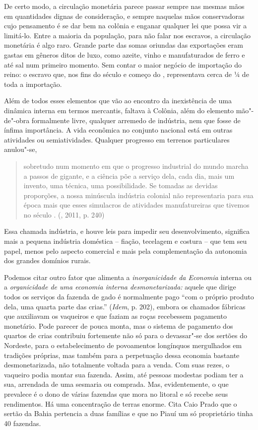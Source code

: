 De certo modo, a circulação monetária parece passar sempre nas mesmas
mãos em quantidades dignas de consideração, e sempre naquelas mãos
conservadoras cujo pensamento é se dar bem na colônia e enganar qualquer
lei que possa vir a limitá-lo. Entre a maioria da população, para não
falar nos escravos, a circulação monetária é algo raro. Grande parte das
somas oriundas das exportações eram gastas em gêneros ditos de luxo,
como azeite, vinho e manufaturados de ferro e até sal num primeiro
momento. Sem contar o maior negócio de importação do reino: o escravo
que, nos fins do século  e começo do , representava cerca de ¼
de toda a importação.

Além de todos esses elementos que vão ao encontro da inexistência de uma
dinâmica interna em termos mercantis, faltava à Colônia, além do
elemento mão"-de"-obra formalmente livre, qualquer arremedo de indústria,
nem que fosse de ínfima importância. A vida econômica no conjunto
nacional está em outras atividades ou semiatividades. Qualquer progresso
em terrenos particulares anulou"-se,

\begin{quote}
sobretudo num momento em que o progresso industrial do mundo marcha a
passos de gigante, e a ciência põe a serviço dela, cada dia, mais um
invento, uma técnica, uma possibilidade. Se tomadas as devidas
proporções, a nossa minúscula indústria colonial não representaria para
sua época mais que esses simulacros de atividades manufatureiras que
tivemos no século . (, 2011, p. 240)
\end{quote}

Essa chamada indústria, e houve leis para impedir seu desenvolvimento,
significa mais a pequena indústria doméstica -- fiação, tecelagem e
costura -- que tem seu papel, menos pelo aspecto comercial e mais pela
complementação da autonomia dos grandes domínios rurais.

Podemos citar outro fator que alimenta a \emph{inorganicidade da
Economia} interna ou a \emph{organicidade de uma economia interna
desmonetarizada:} aquele que dirige todos os serviços da fazenda de gado
é normalmente pago ``com o próprio produto dela, uma quarta parte das
crias.'' (\emph{Idem}, p. 202), embora os chamados fábricas que
auxiliavam os vaqueiros e que faziam as roças recebessem pagamento
monetário. Pode parecer de pouca monta, mas o sistema de pagamento dos
quartos de crias contribuiu fortemente não só para o devassar"-se dos
sertões do Nordeste, para o estabelecimento de povoamentos longínquos
mergulhados em tradições próprias, mas também para a perpetuação dessa
economia bastante desmonetarizada, não totalmente voltada para a venda.
Com suas rezes, o vaqueiro podia montar sua fazenda. Assim, até pessoas
modestas podiam ter a sua, arrendada de uma sesmaria ou comprada. Mas,
evidentemente, o que prevalece é o dono de várias fazendas que mora no
litoral e só recebe seus rendimentos. Há uma concentração de terras
enorme. Cita Caio Prado que o sertão da Bahia pertencia a duas famílias
e que no Piauí um só proprietário tinha 40 fazendas.

